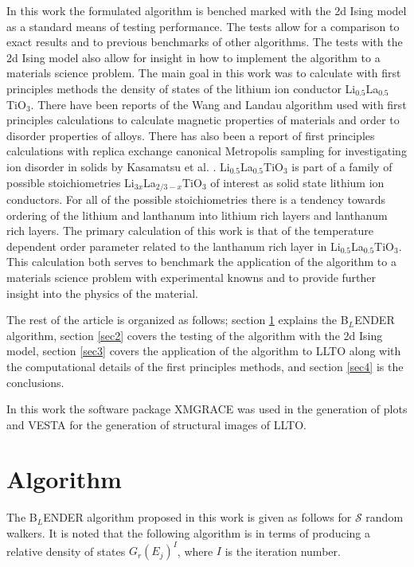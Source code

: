 \documentclass[aps,pre,reprint,superscriptaddress,showkeys]{revtex4-1}
\begin{document}
   In this work the formulated algorithm is benched marked with the 2d Ising model as a standard means of testing  performance.  The tests allow for a comparison to exact results and to previous benchmarks of other algorithms. The tests with the 2d Ising model also allow for insight in how to implement the algorithm to a materials science problem. The main goal in this work  was to calculate with first principles methods the  density of states of the lithium ion conductor Li$_{0.5}$La$_{0.5}$TiO$_3$. There  have been  reports of the Wang and Landau algorithm used with first principles calculations to calculate magnetic properties of materials and order to disorder properties of alloys\cite{Eisenbach, FP_Wang_Landau_CuZn}. There has also been a report of first principles calculations with replica exchange canonical Metropolis sampling for investigating ion disorder in solids by Kasamatsu et al. \cite{ion_disorder_replica}.  Li$_{0.5}$La$_{0.5}$TiO$_3$ is part of a family of possible stoichiometries Li$_{3x}$La$_{2/3 -x}$TiO$_3$ of interest as solid state lithium ion conductors\cite{domainboundaries,P4mmmstrucuture,imaginary_phonons,GENG2009555,peculiarities,LLTOreview,Li_La_ordering_computational}. For all of the possible stoichiometries there is a tendency towards ordering of the lithium and lanthanum into lithium rich layers and lanthanum rich layers.  The primary calculation of this work is that of the temperature dependent order parameter related to the lanthanum rich layer in Li$_{0.5}$La$_{0.5}$TiO$_3$. This calculation both serves to benchmark the application of the algorithm to a materials science problem with experimental knowns and to provide further insight into the physics of the material. 
   
   The rest of the article is organized as follows; section \ref{sec1} explains the B$_{L}$ENDER algorithm, section \ref{sec2} covers the testing of the algorithm with the 2d Ising model, section \ref{sec3} covers the application of the algorithm to LLTO along with the computational details of the first principles methods, and section \ref{sec4} is the conclusions. 
   
   In this work the software package XMGRACE\cite{XMGRACE} was used in the generation of plots and VESTA\cite{Vesta}  for the generation of structural images of LLTO.

\section{Algorithm}
\label{sec1}
The B$_{L}$ENDER algorithm proposed in this work  is given as follows for $\mathcal{S}$ random walkers. It is noted that the following algorithm is in terms of producing a relative density of states $G_{r}(E_j)^I$, where $I$ is the iteration number. 
\end{document}
